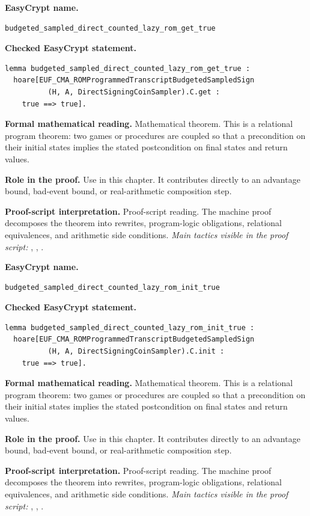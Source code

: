 \begin{formaltheorem}
\noindent\textbf{EasyCrypt name.}
\begin{lstlisting}[language=EasyCrypt,basicstyle=\ttfamily\scriptsize]
budgeted_sampled_direct_counted_lazy_rom_get_true
\end{lstlisting}
\noindent\textbf{Checked EasyCrypt statement.}
\begin{lstlisting}[language=EasyCrypt,basicstyle=\ttfamily\scriptsize]
lemma budgeted_sampled_direct_counted_lazy_rom_get_true :
  hoare[EUF_CMA_ROMProgrammedTranscriptBudgetedSampledSign
          (H, A, DirectSigningCoinSampler).C.get :
    true ==> true].
\end{lstlisting}
\noindent\textbf{Formal mathematical reading.}
Mathematical theorem. This is a relational program theorem: two games or procedures are coupled so that a precondition on their initial states implies the stated postcondition on final states and return values.

\noindent\textbf{Role in the proof.}
Use in this chapter. It contributes directly to an advantage bound, bad-event bound, or real-arithmetic composition step.

\noindent\textbf{Proof-script interpretation.}
Proof-script reading. The machine proof decomposes the theorem into rewrites, program-logic obligations, relational equivalences, and arithmetic side conditions.
\emph{Main tactics visible in the proof script:} , , .

\end{formaltheorem}

\begin{formaltheorem}
\noindent\textbf{EasyCrypt name.}
\begin{lstlisting}[language=EasyCrypt,basicstyle=\ttfamily\scriptsize]
budgeted_sampled_direct_counted_lazy_rom_init_true
\end{lstlisting}
\noindent\textbf{Checked EasyCrypt statement.}
\begin{lstlisting}[language=EasyCrypt,basicstyle=\ttfamily\scriptsize]
lemma budgeted_sampled_direct_counted_lazy_rom_init_true :
  hoare[EUF_CMA_ROMProgrammedTranscriptBudgetedSampledSign
          (H, A, DirectSigningCoinSampler).C.init :
    true ==> true].
\end{lstlisting}
\noindent\textbf{Formal mathematical reading.}
Mathematical theorem. This is a relational program theorem: two games or procedures are coupled so that a precondition on their initial states implies the stated postcondition on final states and return values.

\noindent\textbf{Role in the proof.}
Use in this chapter. It contributes directly to an advantage bound, bad-event bound, or real-arithmetic composition step.

\noindent\textbf{Proof-script interpretation.}
Proof-script reading. The machine proof decomposes the theorem into rewrites, program-logic obligations, relational equivalences, and arithmetic side conditions.
\emph{Main tactics visible in the proof script:} , , .

\end{formaltheorem}

